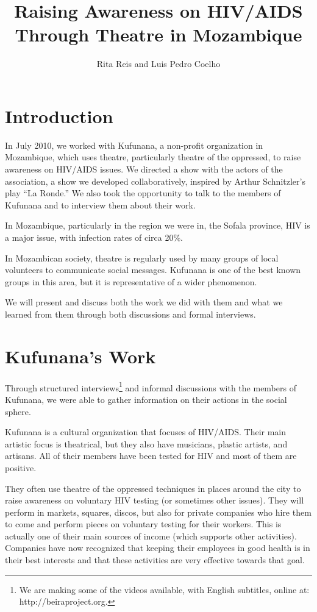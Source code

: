 \documentclass[article,twocolumn]{memoir}
\title{Raising Awareness on HIV/AIDS Through Theatre in Mozambique}
\author{Rita Reis and Luis Pedro Coelho}
\begin{document}
\maketitle

\chapter{Introduction}

In July 2010, we worked with Kufunana, a non-profit organization in Mozambique,
which uses theatre, particularly theatre of the oppressed, to raise awareness
on HIV/AIDS issues. We directed a show with the actors of the association, a
show we developed collaboratively, inspired by Arthur Schnitzler's play ``La
Ronde.'' We also took the opportunity to talk to the members of Kufunana and to
interview them about their work.

In Mozambique, particularly in the region we were in, the Sofala province, HIV
is a major issue, with infection rates of circa 20\%.

In Mozambican society, theatre is regularly used by many groups of local
volunteers to communicate social messages. Kufunana is one of the best known
groups in this area, but it is representative of a wider phenomenon.

We will present and discuss both the work we did with them and what we learned
from them through both discussions and formal interviews.

\chapter{Kufunana's Work}

Through structured interviews\footnote{We are making some of the videos
available, with English subtitles, online at: http://beiraproject.org.} and
informal discussions with the members of Kufunana, we were able to gather
information on their actions in the social sphere.

Kufunana is a cultural organization that focuses of HIV/AIDS. Their main
artistic focus is theatrical, but they also have musicians, plastic artists,
and artisans. All of their members have been tested for HIV and most of them are
positive.

They often use theatre of the oppressed techniques in places around the city to
raise awareness on voluntary HIV testing (or sometimes other issues). They will
perform in markets, squares, discos, but also for private companies who hire
them to come and perform pieces on voluntary testing for their workers. This is
actually one of their main sources of income (which supports other activities).
Companies have now recognized that keeping their employees in good health is in
their best interests and that these activities are very effective towards that
goal.
\end{document}
